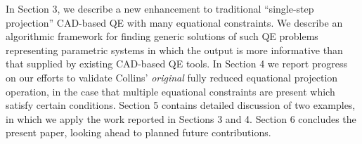 \documentclass{article}
\newtheorem{definition}{Definition}
\begin{document}
In Section 3, we describe a new enhancement to traditional ``single-step projection'' CAD-based QE with many equational constraints.
We describe an algorithmic framework for finding generic solutions of such QE problems representing parametric systems in which the output is more informative than that supplied by existing CAD-based QE tools.
In Section 4 we report progress on our efforts to validate Collins' {\em original} fully reduced equational projection operation, in the case that multiple equational constraints are present which satisfy certain conditions. 
Section 5 contains detailed discussion of two examples, in which we apply the work reported in Sections 3 and 4. Section 6 concludes the present paper, looking ahead to planned future contributions.



\end{document}
